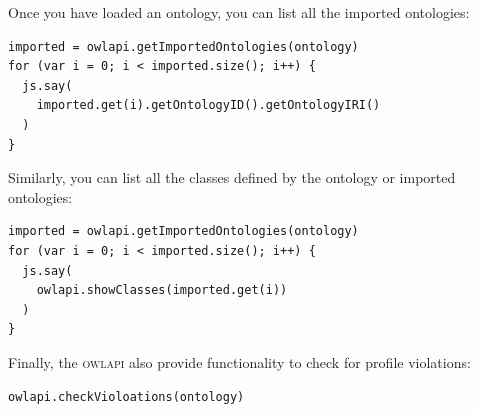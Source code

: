 \documentclass{book}
\begin{document}
\begin{refsection}
Once you have loaded an ontology, you can list all
the imported ontologies:

\begin{Verbatim}
imported = owlapi.getImportedOntologies(ontology)
for (var i = 0; i < imported.size(); i++) {
  js.say(
    imported.get(i).getOntologyID().getOntologyIRI()
  )
}
\end{Verbatim}

Similarly, you can list all the classes defined by the
ontology or imported ontologies:

\begin{Verbatim}
imported = owlapi.getImportedOntologies(ontology)
for (var i = 0; i < imported.size(); i++) {
  js.say(
    owlapi.showClasses(imported.get(i))
  )
}
\end{Verbatim}

Finally, the \textsc{owlapi} also provide functionality to check for
profile violations:

\begin{Verbatim}
owlapi.checkVioloations(ontology)
\end{Verbatim}


\printbibliography[heading=subbibliography]
\end{refsection}
\end{document}
